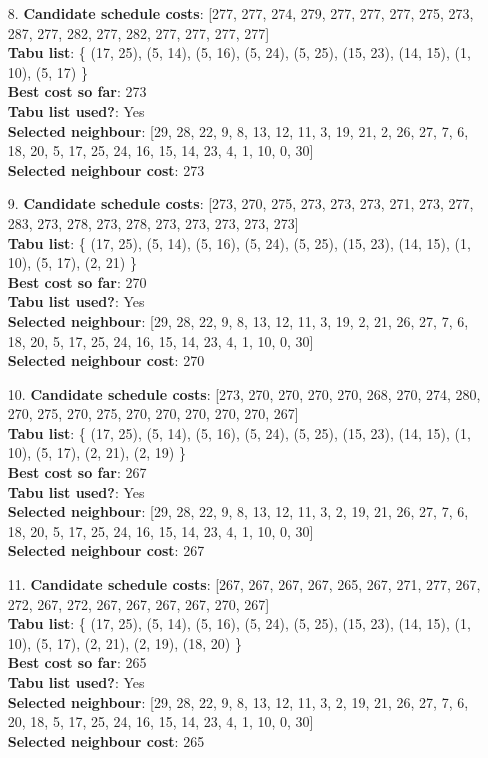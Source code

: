 \documentclass[fleqn]{article}
\begin{document}
\begin{itemize}
    \item[8.] \textbf{Candidate schedule costs}: [277, 277, 274, 279, 277, 277, 277, 275, 273, 287, 277, 282, 277, 282, 277, 277, 277, 277] \\
    \textbf{Tabu list}: \{ (17, 25), (5, 14), (5, 16), (5, 24), (5, 25), (15, 23), (14, 15), (1, 10), (5, 17) \} \\
    \textbf{Best cost so far}: 273 \\
    \textbf{Tabu list used?}: Yes \\
    \textbf{Selected neighbour}: [29, 28, 22, 9, 8, 13, 12, 11, 3, 19, 21, 2, 26, 27, 7, 6, 18, 20, 5, 17, 25, 24, 16, 15, 14, 23, 4, 1, 10, 0, 30] \\
    \textbf{Selected neighbour cost}: 273
      

    \item[9.] \textbf{Candidate schedule costs}: [273, 270, 275, 273, 273, 273, 271, 273, 277, 283, 273, 278, 273, 278, 273, 273, 273, 273, 273] \\
    \textbf{Tabu list}: \{ (17, 25), (5, 14), (5, 16), (5, 24), (5, 25), (15, 23), (14, 15), (1, 10), (5, 17), (2, 21) \} \\
    \textbf{Best cost so far}: 270 \\
    \textbf{Tabu list used?}: Yes \\
    \textbf{Selected neighbour}: [29, 28, 22, 9, 8, 13, 12, 11, 3, 19, 2, 21, 26, 27, 7, 6, 18, 20, 5, 17, 25, 24, 16, 15, 14, 23, 4, 1, 10, 0, 30] \\
    \textbf{Selected neighbour cost}: 270
      

    \item[10.] \textbf{Candidate schedule costs}: [273, 270, 270, 270, 270, 268, 270, 274, 280, 270, 275, 270, 275, 270, 270, 270, 270, 270, 267] \\
    \textbf{Tabu list}: \{ (17, 25), (5, 14), (5, 16), (5, 24), (5, 25), (15, 23), (14, 15), (1, 10), (5, 17), (2, 21), (2, 19) \} \\
    \textbf{Best cost so far}: 267 \\
    \textbf{Tabu list used?}: Yes \\
    \textbf{Selected neighbour}: [29, 28, 22, 9, 8, 13, 12, 11, 3, 2, 19, 21, 26, 27, 7, 6, 18, 20, 5, 17, 25, 24, 16, 15, 14, 23, 4, 1, 10, 0, 30] \\
    \textbf{Selected neighbour cost}: 267
      

    \item[11.] \textbf{Candidate schedule costs}: [267, 267, 267, 267, 265, 267, 271, 277, 267, 272, 267, 272, 267, 267, 267, 267, 270, 267] \\
    \textbf{Tabu list}: \{ (17, 25), (5, 14), (5, 16), (5, 24), (5, 25), (15, 23), (14, 15), (1, 10), (5, 17), (2, 21), (2, 19), (18, 20) \} \\
    \textbf{Best cost so far}: 265 \\
    \textbf{Tabu list used?}: Yes \\
    \textbf{Selected neighbour}: [29, 28, 22, 9, 8, 13, 12, 11, 3, 2, 19, 21, 26, 27, 7, 6, 20, 18, 5, 17, 25, 24, 16, 15, 14, 23, 4, 1, 10, 0, 30] \\
    \textbf{Selected neighbour cost}: 265
      


\end{itemize}
\end{document}
